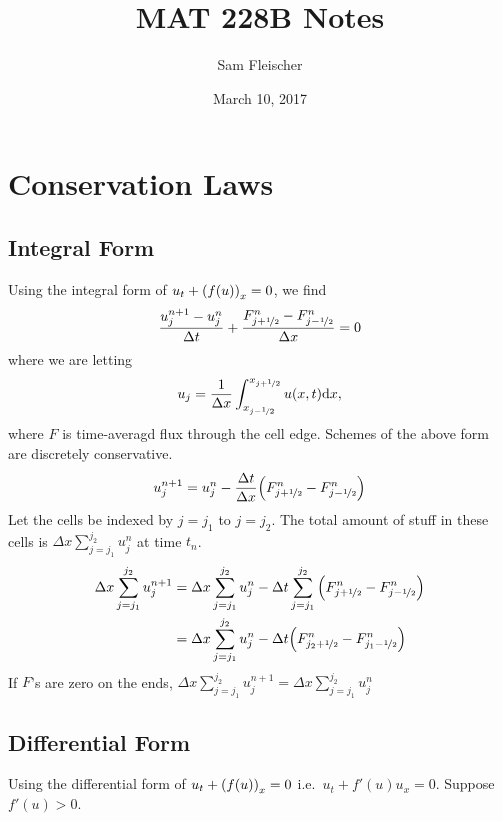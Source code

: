 \documentclass{article}
\title{MAT 228B Notes}
\author{Sam Fleischer}
\date{March 10, 2017}
\newcommand{\half}{\nicefrac{1}{2}}
\newcommand{\Dx}{\Delta x}
\newcommand{\Dt}{\Delta t}
\begin{document}
    \maketitle

    \section{Conservation Laws}

        \subsection{Integral Form}
            Using the integral form of $u_t + \qty(f(u))_x = 0$, we find
            \begin{align*}
                \frac{u_j^{n+1} - u_j^n}{\Dt} + \frac{F_{j+\half}^n - F_{j-\half}^n}{\Dx} = 0
            \end{align*}
            where we are letting
            \begin{align*}
                u_j = \frac{1}{\Dx}\int_{x_{j-\half}}^{x_{j+\half}}u(x,t)\dd x,
            \end{align*}
            where $F$ is time-averagd flux through the cell edge.  Schemes of the above form are discretely conservative.
            \begin{align*}
                u_j^{n+1} = u_j^n - \frac{\Dt}{\Dx}\qty(F_{j+\half}^n - F_{j-\half}^n)
            \end{align*}
            Let the cells be indexed by $j = j_1$ to $j = j_2$.  The total amount of stuff in these cells is $\Dx\sum_{j=j_1}^{j_2} u_j^n$ at time $t_n$.
            \begin{align*}
                \Dx\sum_{j=j_1}^{j_2}u_j^{n+1} &= \Dx\sum_{j=j_1}^{j_2}u_j^n - \Dt\sum_{j=j_1}^{j_2}\qty(F_{j+\half}^n - F_{j-\half}^n) \\
                &= \Dx\sum_{j=j_1}^{j_2}u_j^n - \Dt\qty(F_{j_2 +\half}^n - F_{j_1-\half}^n)
            \end{align*}
            If $F$'s are zero on the ends, $\Dx\sum_{j=j_1}^{j_2}u_j^{n+1} = \Dx\sum_{j=j_1}^{j_2}u_j^n$

        \subsection{Differential Form}
            Using the differential form of $u_t + \qty(f(u))_x = 0$ i.e.~$u_t + f'(u)u_x = 0$.  Suppose $f'(u) > 0$.
\end{document}
